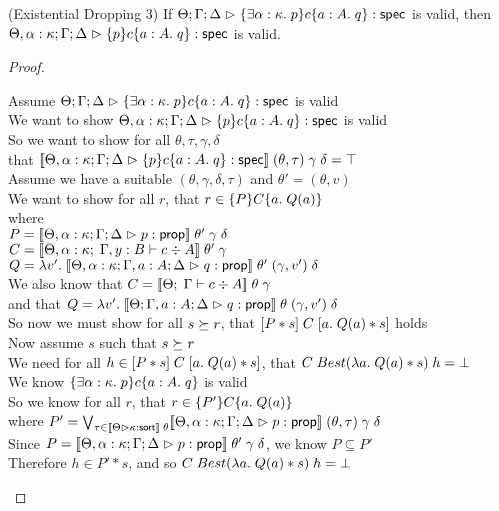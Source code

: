 \begin{lemma}{(Existential Dropping 3)}
If $\judgeS{\spec{\exists \alpha:\kappa.\;p}{c}{a:A}{q}}$ is valid, then 
   $\judgeS[\Theta, \alpha:\kappa; \Gamma; \Delta]{\spec{p}{c}{a:A}{q}}$ is valid. 
\end{lemma}

\begin{proof}
  \begin{tabbedproof}
    \oo Assume $\judgeS{\spec{\exists \alpha:\kappa.\;p}{c}{a:A}{q}}$ is valid \\
    \ooo We want to show $\judgeS[\Theta, \alpha:\kappa; \Gamma; \Delta]{\spec{p}{c}{a:A}{q}}$ is valid \\
    \ooo So we want to show for all $\theta, \tau, \gamma, \delta$  \\
    \ooox that $\interp{\judgeS[\Theta, \alpha:\kappa; \Gamma; \Delta]{\spec{p}{c}{a:A}{q}}}\;(\theta, \tau)\;\gamma\;\delta = \top$ \\
    \ooo Assume we have a suitable $(\theta, \gamma, \delta, \tau)$ and $\theta' = (\theta, v)$\\ 
    \oooo We want to show for all $r$, that $r \in \spec{P}{C}{a}{Q(a)}$ \\
    \oooo where \\
    \oooox $P = \interp{\judgeA[\Theta, \alpha:\kappa; \Gamma; \Delta]{p}{\assert}}\;\theta'\;\gamma\;\delta$ \\
    \oooox $C = \interp{\judgeC[\Theta, \alpha:\kappa]{\Gamma, y:B}{c}{A}}\;\theta'\;\gamma$ \\
    \oooox $Q = \semfun{v'}{\interp{\judgeA[\Theta, \alpha:\kappa; \Gamma, a:A; \Delta]{q}{\assert}}\;\theta'\;(\gamma, v')\;\delta}$ \\
    \oooo We also know that $C = \interp{\judgeC[\Theta]{\Gamma}{c}{A}}\;\theta\;\gamma$ \\
    \oooo and that $Q = \semfun{v'}{\interp{\judgeA[\Theta;\Gamma, a:A;\Delta]{q}{\assert}}\;\theta\;(\gamma, v')\;\delta}$\\
    \oooo So now we must show for all $s \worldgeq r$, that $\basicspec{P * s}{C}{a}{Q(a) * s}$ holds\\
    \oooo Now assume $s$ such that $s \worldgeq r$ \\
    \ooooo We need for all $h \in \basicspec{P * s}{C}{a}{Q(a) * s}$, that 
             $C\;Best(\semfun{a}{Q(a) * s})\;h = \bot$ \\
    \ooooo We know $\spec{\exists \alpha:\kappa.\;p}{c}{a:A}{q}$ is valid \\
    \ooooo So we know for all $r$, that $r \in \spec{P'}{C}{a}{Q(a)}$ \\
    \oooox where $P' = \bigvee_{\tau \in \interp{\judgeSort{\kappa}}\;\theta} \interp{\judgeA[\Theta, \alpha:\kappa; \Gamma; \Delta]{p}{\assert}}\;(\theta, \tau)\;\gamma\;\delta$ \\
    \ooooo Since $P = \interp{\judgeA[\Theta, \alpha:\kappa; \Gamma; \Delta]{p}{\assert}}\;\theta'\;\gamma\;\delta$, we know $P \subseteq P'$ \\
    \ooooo Therefore $h \in P' * s$, and so $C\;Best(\semfun{a}{Q(a) * s})\;h = \bot$ \\
    

\end{tabbedproof}
\end{proof}
